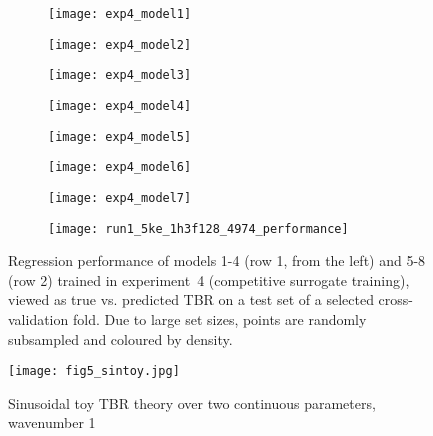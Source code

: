 \begin{figure}[h]
	\centering
	\begin{subfigure}[b]{0.25\textwidth}
		\centering
		\texttt{[image: exp4\_model1]}
	\end{subfigure}\hfill%
	\begin{subfigure}[b]{0.25\textwidth}
		\centering
		\texttt{[image: exp4\_model2]}
	\end{subfigure}\hfill%
	\begin{subfigure}[b]{0.25\textwidth}
		\centering
		\texttt{[image: exp4\_model3]}
	\end{subfigure}\hfill%
	\begin{subfigure}[b]{0.25\textwidth}
		\centering
		\texttt{[image: exp4\_model4]}
	\end{subfigure}

	\begin{subfigure}[b]{0.25\textwidth}
		\centering
		\texttt{[image: exp4\_model5]}
	\end{subfigure}\hfill%
	\begin{subfigure}[b]{0.25\textwidth}
		\centering
		\texttt{[image: exp4\_model6]}
	\end{subfigure}\hfill%
	\begin{subfigure}[b]{0.25\textwidth}
		\centering
		\texttt{[image: exp4\_model7]}
	\end{subfigure}\hfill%
	\begin{subfigure}[b]{0.25\textwidth}
		\centering
		\texttt{[image: run1\_5ke\_1h3f128\_4974\_performance]}
	\end{subfigure}
	\caption{Regression performance of models 1-4 (row 1, from the left) and 5-8
		(row 2) trained in experiment~4 (competitive surrogate training), viewed
		as true vs. predicted TBR on a test set of a selected cross-validation
		fold. Due to large set sizes, points are randomly subsampled and coloured by density.}
	\label{fig:reg-performance}
\end{figure}

\newpage

\begin{wrapfigure}{r}{0.4\textwidth}
  \vspace{-60pt}
  \begin{center}
    \texttt{[image: fig5\_sintoy.jpg]}
	\caption{Sinusoidal toy TBR theory over two continuous parameters, wavenumber 1}
    \label{fig:sintoy}
  \end{center}
  \vspace{-10pt}
\end{wrapfigure}

